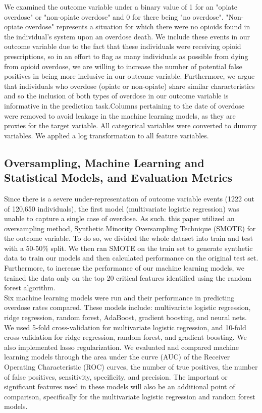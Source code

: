 \documentclass[twoside,10.5pt]{article}
\begin{document}
We examined the outcome variable under a binary value of 1 for an "opiate overdose" or "non-opiate overdose" and 0 for there being "no overdose". "Non-opiate overdose" represents a situation for which there were no opioids found in the individual's system upon an overdose death. We include these events in our outcome variable due to the fact that these individuals were receiving opioid prescriptions, so in an effort to flag as many individuals as possible from dying from opioid overdose, we are willing to increase the number of potential false positives in being more inclusive in our outcome variable. Furthermore, we argue that individuals who overdose (opiate or non-opiate) share similar characteristics and so the inclusion of both types of overdose in our outcome variable is informative in the prediction task.Columns pertaining to the date of overdose were removed to avoid leakage in the machine learning models, as they are proxies for the target variable. All categorical variables were converted to dummy variables. We applied a log transformation to all feature variables. 

\subsection{Oversampling, Machine Learning and Statistical Models, and Evaluation Metrics}
Since there is a severe under-representation of outcome variable events (1222 out of 120,650 individuals), the first model (multivariate logistic regression) was unable to capture a single case of overdose. As such. this paper utilized an oversampling method, Synthetic Minority Oversampling Technique (SMOTE) for the outcome variable. To do so, we divided the whole dataset into train and test with a 50-50\% split. We then ran SMOTE on the train set to generate synthetic data to train our models and then calculated performance on the original test set. Furthermore, to increase the performance of our machine learning models, we trained the data only on the top 20 critical features identified using the random forest algorithm.\\

Six machine learning models were run and their performance in predicting overdose rates compared. These models include: multivariate logistic regression, ridge regression, random forest, AdaBoost, gradient boosting, and neural nets. We used 5-fold cross-validation for multivariate logistic regression, and 10-fold cross-validation for ridge regression, random forest, and gradient boosting. We also implemented lasso regularization. We evaluated and compared machine learning models through the area under the curve (AUC) of the Receiver Operating Characteristic (ROC) curves, the number of true positives, the number of false positives, sensitivity, specificity, and precision. The important or significant features used in these models will also be an additional point of comparison, specifically for the multivariate logistic regression and random forest models. \\
\end{document}
